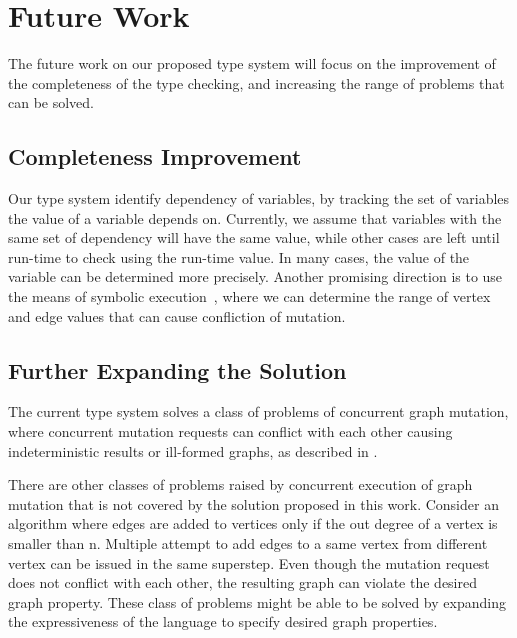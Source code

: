 \section{Future Work}
The future work on our proposed type system will focus on the improvement of the
completeness of the type checking, and increasing the range of problems that can
be solved.

\subsection{Completeness Improvement}
Our type system identify dependency of variables, by tracking the set of
variables the value of a variable depends on. Currently, we
assume that variables with the same set of dependency will have the same value,
while other cases are left until run-time to check using the run-time value. In
many cases, the value of the variable can be determined more precisely.
Another promising direction is to use the means of symbolic
execution~\cite{king1976}, where we can determine the range of vertex and edge
values that can cause confliction of mutation.

\subsection{Further Expanding the Solution}
The current type system solves a class of problems of concurrent graph mutation,
where concurrent mutation requests can conflict with each other causing
indeterministic results or ill-formed graphs, as described in . 

There are other classes of problems raised by concurrent execution of graph
mutation that is not covered by the solution proposed in this work. Consider an
algorithm where edges are added to vertices only if the out degree of a vertex
is smaller than n. Multiple attempt to add edges to a same vertex from
different vertex can be issued in the same superstep. Even though the mutation
request does not conflict with each other, the resulting graph can violate the
desired graph property. These class of problems might be able to be solved by
expanding the expressiveness of the language to specify desired graph
properties. 
